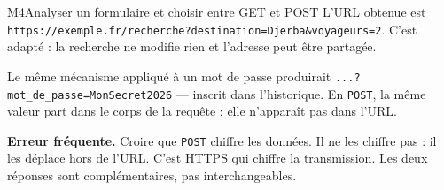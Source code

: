 \begin{fichemethode}{M4}{Analyser un formulaire et choisir entre GET et POST}
L'URL obtenue est
\lstinline{https://exemple.fr/recherche?destination=Djerba&voyageurs=2}. C'est adapté : la
recherche ne modifie rien et l'adresse peut être partagée.

Le même mécanisme appliqué à un mot de passe produirait
\lstinline{...?mot_de_passe=MonSecret2026} — inscrit dans l'historique. En \lstinline{POST},
la même valeur part dans le corps de la requête : elle n'apparaît pas dans l'URL.

\textbf{Erreur fréquente.} Croire que \lstinline{POST} chiffre les données. Il ne les chiffre
pas : il les déplace hors de l'URL. C'est HTTPS qui chiffre la transmission. Les deux réponses
sont complémentaires, pas interchangeables.

\end{fichemethode}
